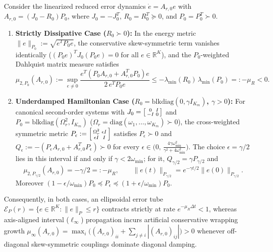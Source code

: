 \begin{proposition}
\label{prop:dahlquist}
Consider the linearized reduced error dynamics \(\dot{e} = A_{r,0} e\) with \(A_{r,0} = (J_0 - R_0)P_0\), where \(J_0 = -J_0^T\), \(R_0 = R_0^T \succeq 0\), and \(P_0 = P_0^T \succ 0\).
\begin{enumerate}
    \item \textbf{Strictly Dissipative Case (\(R_0 \succ 0\)):} In the energy metric \(\|e\|_{P_0} := \sqrt{e^T P_0 e}\), the conservative skew-symmetric term vanishes identically (\((P_0 e)^T J_0 (P_0 e) = 0\) for all \(e \in \mathbb{R}^K\)), and the \(P_0\)-weighted Dahlquist matrix measure satisfies
    \begin{equation}
    \label{eq:mu_p0}
    \mu_{2,P_0}(A_{r,0}) := \sup_{e \neq 0} \frac{e^T (P_0 A_{r,0} + A_{r,0}^T P_0) e}{2\,e^T P_0 e} \le -\lambda_{\min}(R_0)\,\lambda_{\min}(P_0) =: -\mu_R < 0.
    \end{equation}
    \item \textbf{Underdamped Hamiltonian Case (\(R_0 = \mathrm{blkdiag}(0, \gamma I_{K_m})\), \(\gamma > 0\)):} For canonical second-order systems with \(J_0 = \begin{bsmallmatrix} 0 & I \\ -I & 0 \end{bsmallmatrix}\) and \(P_0 = \mathrm{blkdiag}(\Omega_r^2, I_{K_m})\) (\(\Omega_r = \mathrm{diag}(\omega_1, \dots, \omega_{K_m}) \succ 0\)), the cross-weighted symmetric metric \(P_\epsilon := \begin{bsmallmatrix} \Omega_r^2 & \epsilon I \\ \epsilon I & I \end{bsmallmatrix}\) satisfies \(P_\epsilon \succ 0\) and \(Q_\epsilon := -(P_\epsilon A_{r,0} + A_{r,0}^TP_\epsilon) \succ 0\) for every \(\epsilon \in \big(0,\, \frac{4\gamma \omega_{\min}^2}{\gamma^2 + 4\omega_{\min}^2}\big)\). The choice \(\epsilon = \gamma/2\) lies in this interval if and only if \(\gamma < 2\omega_{\min}\); for it, \(Q_{\gamma/2} = \gamma P_{\gamma/2}\) and
    \begin{equation}
    \label{eq:mu_pe}
    \mu_{2,P_{\gamma/2}}(A_{r,0}) = -\gamma/2 =: -\mu_R, \qquad \|e(t)\|_{P_{\gamma/2}} = e^{-\gamma t/2}\|e(0)\|_{P_{\gamma/2}} .
    \end{equation}
    Moreover \((1 - \epsilon/\omega_{\min})P_0 \preceq P_\epsilon \preceq (1 + \epsilon/\omega_{\min})P_0\).
\end{enumerate}
Consequently, in both cases, an ellipsoidal error tube \(\mathcal{E}_P(r) = \{e \in \mathbb{R}^K : \|e\|_P \le r\}\) contracts strictly at rate \(e^{-\mu_R \Delta t} < 1\), whereas axis-aligned interval (\(\ell_\infty\)) propagation incurs artificial conservative wrapping growth \(\mu_\infty(A_{r,0}) = \max_i\big((A_{r,0})_{ii} + \sum_{j \neq i} |(A_{r,0})_{ij}|\big) > 0\) whenever off-diagonal skew-symmetric couplings dominate diagonal damping.
\end{proposition}

